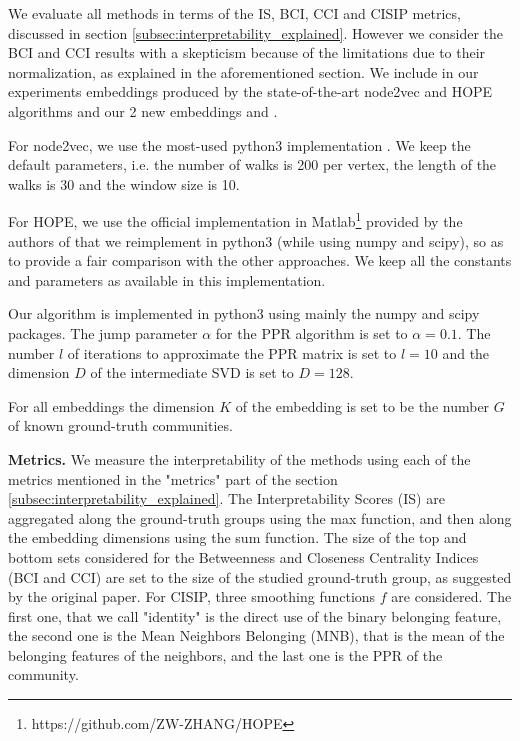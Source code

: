 We evaluate all methods in terms of the IS, BCI, CCI and CISIP metrics, discussed in section \ref{subsec:interpretability_explained}. However we consider the BCI and CCI results with a skepticism because of the limitations due to their normalization, as explained in the aforementioned section.
We include in our experiments embeddings produced by the state-of-the-art node2vec and HOPE algorithms and our 2 new embeddings \newembLeft{} and \newembRight{}.

For node2vec, we use the most-used python3 implementation \cite{node2vec_impl}. We keep the default parameters, i.e. the number of walks is 200 per vertex, the length of the walks is 30 and the window size is 10.

For HOPE, we use the official implementation in Matlab\footnote{https://github.com/ZW-ZHANG/HOPE} provided by the authors of \cite{HOPE} that we reimplement in python3 (while using numpy and scipy), so as to provide a fair comparison with the other approaches. We keep all the constants and parameters as available in this implementation.

Our algorithm is implemented in python3 using mainly the numpy \cite{numpy} and scipy \cite{scipy} packages. The jump parameter $\alpha$ for the PPR algorithm is set to $\alpha=0.1$. The number $l$ of iterations to approximate the PPR matrix is set to $l=10$ and the dimension $D$ of the intermediate SVD is set to $D=128$.

For all embeddings %
the dimension $K$ of the embedding is set to be the number $G$ of known ground-truth communities.

\noindent\textbf{Metrics.} We measure the interpretability of the methods using each of the metrics mentioned in the "metrics" part of the section \ref{subsec:interpretability_explained}. The Interpretability Scores (IS) are aggregated along the ground-truth groups using the max function, and then along the embedding dimensions using the sum function.
The size of the top and bottom sets considered for the Betweenness and Closeness Centrality Indices (BCI and CCI) are set to the size of the studied ground-truth group, as suggested by the original paper.
For CISIP, three smoothing functions $f$ are considered. The first one, that we call "identity" is the direct use of the binary belonging feature, the second one is the Mean Neighbors Belonging (MNB), that is the mean of the belonging features of the neighbors, and the last one is the PPR of the community.

